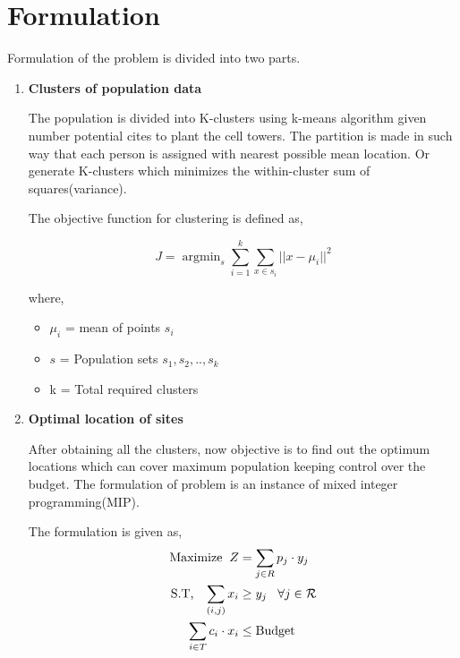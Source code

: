 \documentclass[preprint,12pt]{elsarticle}
\DeclareMathOperator*{\argmin}{argmin}
\begin{document}
\section{Formulation} \label{sec:formulation}
Formulation of the problem is divided into two parts.
\begin{enumerate}
\item \textbf{Clusters of population data }

The population is divided into K-clusters using k-means algorithm given number potential cites to plant the cell towers. The partition is made in such way that each person is assigned with nearest possible mean location. Or generate K-clusters which minimizes the within-cluster sum of squares(variance).

The objective function for clustering is defined as\cite{wikiKmeans},

\begin{equation}
J = \argmin_s \sum_{i=1}^{k} \sum_{x\in s_i} ||x - \mu_i ||^2
\end{equation}

where,
\begin{itemize}
	\item $\mu_i$ = mean of points $s_i$
	\item $s$ = Population sets ${s_1,s_2,..,s_k} $
	\item k = Total required clusters
\end{itemize}

\item \textbf{Optimal location of sites}

After obtaining all the clusters, now objective is to find out the optimum locations which can cover maximum population keeping control over the budget. The formulation of problem is an instance of  mixed integer programming(MIP)\cite{maximal}.

The formulation is given as,
\begin{equation}
	\begin{aligned}
\text{Maximize} \hspace{2mm} Z &= \sum_{j \in R} p_j \cdot y_j \\
\text{S.T,} \hspace{3mm}\sum_{(i,j)} x_i &\geq y_j \hspace{3mm} \forall j \in \mathcal{R} \\
\sum_{i \in T} c_i \cdot x_i &\leq \text{Budget}
\end{aligned}
\end{equation}


\end{enumerate}
\end{document}
